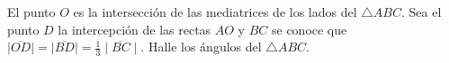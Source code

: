 \begin{problem}
	El punto $O$ es la intersección de las mediatrices de los lados del $\triangle{ABC}$. Sea el punto $D$ la intercepción de las rectas $AO$ y $BC$ se conoce que $\mid \overline{OD} \mid = \mid \overline{BD} \mid = \frac{1}{3} \mid \overline{BC} \mid$. Halle los ángulos del $\triangle{ABC}$.
\end{problem}